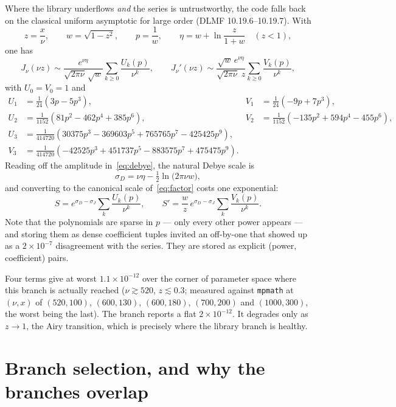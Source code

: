 \documentclass[11pt]{article}
\theoremstyle{remark}
\newcommand{\code}[1]{\texttt{#1}}
\begin{document}
Where the library underflows \emph{and} the series is untrustworthy, the code falls back on
the classical uniform asymptotic for large order (DLMF 10.19.6--10.19.7). With
\[
  z=\frac{x}{\nu},\qquad w=\sqrt{1-z^2},\qquad p=\frac1w,\qquad
  \eta = w+\ln\frac{z}{1+w} \quad (z<1),
\]
one has
\begin{equation}
  J_\nu(\nu z)\sim \frac{e^{\nu\eta}}{\sqrt{2\pi\nu}\,\sqrt{w}}\sum_{k\ge0}\frac{U_k(p)}{\nu^k},
  \qquad
  J_\nu'(\nu z)\sim \frac{\sqrt{w}\,e^{\nu\eta}}{\sqrt{2\pi\nu}\;z}\sum_{k\ge0}\frac{V_k(p)}{\nu^k},
  \label{eq:debye}
\end{equation}
with $U_0=V_0=1$ and
\[
\begin{aligned}
  U_1 &= \tfrac{1}{24}\left(3p-5p^3\right), &
  V_1 &= \tfrac{1}{24}\left(-9p+7p^3\right),\\
  U_2 &= \tfrac{1}{1152}\left(81p^2-462p^4+385p^6\right), &
  V_2 &= \tfrac{1}{1152}\left(-135p^2+594p^4-455p^6\right),\\
  U_3 &= \tfrac{1}{414720}\left(30375p^3-369603p^5+765765p^7-425425p^9\right), &&\\
  V_3 &= \tfrac{1}{414720}\left(-42525p^3+451737p^5-883575p^7+475475p^9\right). &&
\end{aligned}
\]
Reading off the amplitude in~\eqref{eq:debye}, the natural Debye scale is
\begin{equation}
  \sigma_D = \nu\eta - \tfrac12\ln\!\big(2\pi\nu w\big),
  \label{eq:sigmaD}
\end{equation}
and converting to the canonical scale of~\eqref{eq:factor} costs one exponential:
\[
  S = e^{\sigma_D-\sigma_J}\sum_k \frac{U_k(p)}{\nu^k},
  \qquad
  S' = \frac{w}{z}\,e^{\sigma_D-\sigma_J}\sum_k \frac{V_k(p)}{\nu^k}.
\]
Note that the polynomials are sparse in $p$ --- only every other power appears --- and
storing them as dense coefficient tuples invited an off-by-one that showed up as a
$2\times10^{-7}$ disagreement with the series. They are stored as explicit
(power, coefficient) pairs.

Four terms give at worst $1.1\times10^{-12}$ over the corner of parameter space where this
branch is actually reached ($\nu\gtrsim520$, $z\lesssim0.3$; measured against \code{mpmath}
at $(\nu,x)$ of $(520,100)$, $(600,130)$, $(600,180)$, $(700,200)$ and $(1000,300)$, the worst
being the last). The branch reports a flat $2\times10^{-12}$. It degrades only as $z\to1$, the Airy transition, which is
precisely where the library branch is healthy.

\section{Branch selection, and why the branches overlap}
\end{document}
